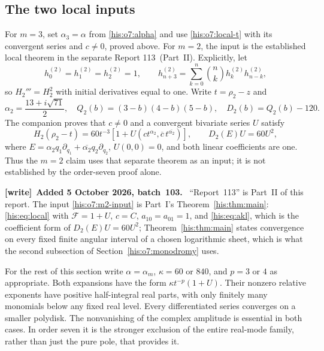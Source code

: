 \documentclass[11pt]{article}
\theoremstyle{remark}\newtheorem{remark}[theorem]{Remark}
\numberwithin{equation}{section}
\newenvironment{writenote}[1][]{\par\smallskip\begingroup\small
 \noindent\textbf{[write]}\if\relax\detokenize{#1}\relax\else~\textbf{#1.}\fi\ }%
 {\par\endgroup\smallskip}
\begin{document}
\subsection{The two local inputs}
For $m=3$, set $\alpha_3=\alpha$ from \eqref{his:o7:alpha} and use
\eqref{his:o7:local-t} with its convergent series and $c\ne0$, proved above. For $m=2$, the input is the established
local theorem in the separate Report 113~(Part~II).
Explicitly, let
\[
h^{(2)}_0=h^{(2)}_1=h^{(2)}_2=1,\qquad
h^{(2)}_{n+3}=\sum_{k=0}^n\binom nk h^{(2)}_kh^{(2)}_{n-k},
\]
so $H_2'''=H_2^2$ with initial derivatives equal to one.
Write $t=\rho_2-z$ and
\[
\alpha_2=\frac{13+i\sqrt{71}}2,\quad
Q_2(b)=(3-b)(4-b)(5-b),\quad D_2(b)=Q_2(b)-120.
\]
The companion proves that $c\ne0$ and a convergent bivariate series
$U$ satisfy
\begin{equation}\label{his:o7:m2-input}
H_2(\rho_2-t)=60t^{-3}
[1+U(ct^{\alpha_2},\overline c\,t^{\overline{\alpha_2}})],
\qquad D_2(E)U=60U^2,
\end{equation}
where $E=\alpha_2q_1\partial_{q_1}
+\overline{\alpha_2}q_2\partial_{q_2}$, $U(0,0)=0$,
and both linear coefficients are one.
Thus the $m=2$ claim uses that separate theorem as an input;
it is not established by the order-seven proof alone.
\begin{writenote}[Added 5 October 2026, batch~103]
``Report~113'' is Part~II of this report. The input \eqref{his:o7:m2-input} is Part~I's Theorem~\ref{his:thm:main}: \eqref{his:eq:local} with $\mathcal F=1+U$, $c=C$, $a_{10}=a_{01}=1$, and \eqref{his:eq:akl}, which is the coefficient form of $D_2(E)U=60U^2$; Theorem~\ref{his:thm:main} states convergence on every fixed finite angular interval of a chosen logarithmic sheet, which is what the second subsection of Section~\ref{his:o7:monodromy} uses.
\end{writenote}


For the rest of this section write $\alpha=\alpha_m$,
$\kappa=60$ or $840$, and $p=3$ or $4$ as appropriate.
Both expansions have the form $\kappa t^{-p}(1+U)$.
Their nonzero relative exponents have positive half-integral real
parts, with only finitely many monomials below any fixed real level.
Every differentiated series converges on a smaller polydisk.
The nonvanishing of the complex amplitude is essential in both
cases. In order seven it is the stronger exclusion of the entire
real-mode family, rather than just the pure pole, that provides it.
\end{document}
